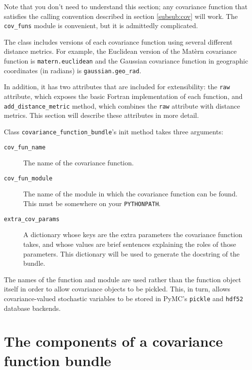 \bigskip
Note that you don't need to understand this section; any covariance function that satisfies the calling convention described in section \ref{subsub:cov} will work. The \texttt{cov_funs} module is convenient, but it is admittedly complicated.

\bigskip
The  class includes versions of each covariance function using several different distance metrics. For example, the Euclidean version of the Mat\`ern covariance function is \texttt{matern.euclidean} and the Gaussian covariance function in geographic coordinates (in radians) is \texttt{gaussian.geo_rad}.

In addition, it has two attributes that are included for extensibility: the \texttt{raw} attribute, which exposes the basic Fortran implementation of each function, and \texttt{add_distance_metric} method, which combines the \texttt{raw} attribute with distance metrics. This section will describe these attributes in more detail.

Class \texttt{covariance_function_bundle}'s init method takes three arguments:
\begin{description}
	\item[\texttt{cov_fun_name}] The name of the covariance function.
	\item[\texttt{cov_fun_module}] The name of the module in which the covariance function can be found. This must be somewhere on your \texttt{PYTHONPATH}.
	\item[\texttt{extra_cov_params}] A dictionary whose keys are the extra parameters the covariance function takes, and whose values are brief sentences explaining the roles of those parameters. This dictionary will be used to generate the docstring of the bundle.
\end{description}
The names of the function and module are used rather than the function object itself in order to allow covariance objects to be pickled. This, in turn, allows covariance-valued stochastic variables to be stored in PyMC's \texttt{pickle} and \texttt{hdf52} database backends.


\section{The components of a covariance function bundle}

